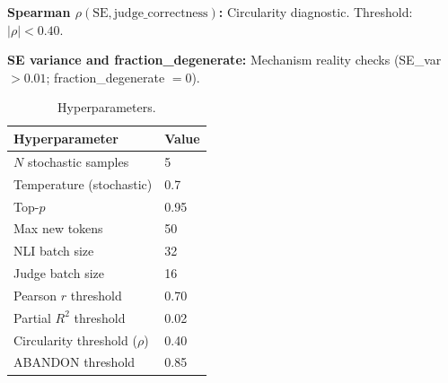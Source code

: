\textbf{Spearman $\rho(\text{SE}, \text{judge\_correctness})$:} Circularity diagnostic. Threshold: $|\rho| < 0.40$.

\textbf{SE variance and fraction\_degenerate:} Mechanism reality checks (SE\_var $> 0.01$; fraction\_degenerate $= 0$).

\begin{table}[h]
\centering
\caption{Hyperparameters.}
\label{tab:hyperparams}
\begin{tabular}{ll}
\toprule
\textbf{Hyperparameter} & \textbf{Value} \\
\midrule
$N$ stochastic samples & 5 \\
Temperature (stochastic) & 0.7 \\
Top-$p$ & 0.95 \\
Max new tokens & 50 \\
NLI batch size & 32 \\
Judge batch size & 16 \\
Pearson $r$ threshold & 0.70 \\
Partial $R^2$ threshold & 0.02 \\
Circularity threshold ($\rho$) & 0.40 \\
ABANDON threshold & 0.85 \\
\bottomrule
\end{tabular}
\end{table}
